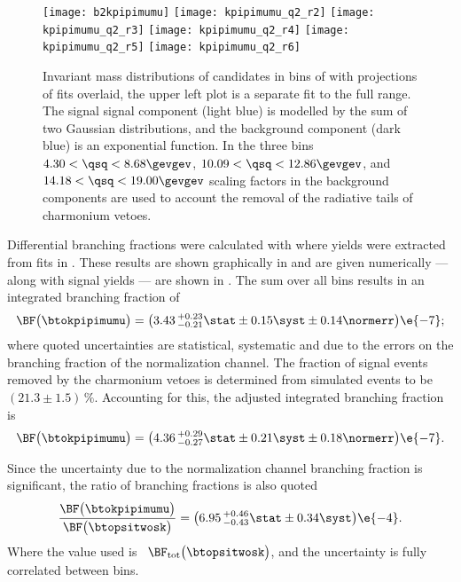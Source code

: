 \begin{figure}
  \begin{center}
    \texttt{[image: b2kpipimumu]}
    \texttt{[image: kpipimumu\_q2\_r2]}
    \texttt{[image: kpipimumu\_q2\_r3]}
    \texttt{[image: kpipimumu\_q2\_r4]}
    \texttt{[image: kpipimumu\_q2\_r5]}
    \texttt{[image: kpipimumu\_q2\_r6]}
    \caption[Fits to signal decay \btokpipimumu]
    {\small
      Invariant mass distributions of \btokpipimumu candidates in bins of \qsq with projections of
      fits overlaid, the upper left plot is a separate fit to the full \qsq range.
      The signal signal component (light blue) is modelled by the sum of two Gaussian
      distributions, and the background component (dark blue) is an exponential function.
      In the three \qsq bins $4.30<\qsq<8.68\gevgev$, $10.09<\qsq<12.86\gevgev$, and
      $14.18<\qsq<19.00\gevgev$ scaling factors in the background components are used to account
      the removal of the radiative tails of charmonium vetoes.
    }
    \label{fig:kpipi:q2fits}
  \end{center}
\end{figure}

Differential branching fractions were calculated with  where yields were
extracted from fits in .
These results are shown graphically in  and are given numerically --- along
with signal yields --- are shown in .
The sum over all \qsq bins results in an integrated branching fraction of
\begin{equation}
  \BF\big( \btokpipimumu \big)=
  \big(3.43\,^{+0.23}_{-0.21}\stat\pm0.15\syst\pm0.14\normerr\big)\e{-7};
\end{equation}
where quoted uncertainties are statistical, systematic and due to the errors on the branching
fraction of the normalization channel.
The fraction of signal events removed by the charmonium vetoes is determined from simulated
 events %
to be $(21.3\pm1.5)\,\%$.
Accounting for this, the adjusted integrated branching fraction is
\begin{equation}
  \BF\big( \btokpipimumu \big)=
  \big(4.36\,^{+0.29}_{-0.27}\stat\pm0.21\syst\pm0.18\normerr\big)\e{-7}.
\end{equation}

Since the uncertainty due to the normalization channel branching fraction is significant, the
ratio of branching fractions is also quoted
\begin{equation}
  \frac{ \BF\big( \btokpipimumu \big) }{ \BF\big( \btopsitwosk \big) } =
  \big(6.95\,^{+0.46}_{-0.43}\stat\pm0.34\syst\big)\e{-4}.
\end{equation}
Where the value used is~\cite{PDG2012}
$\BF_\mathrm{tot}\big(\btopsitwosk\big)$,
and the uncertainty is fully correlated between \qsq bins.

